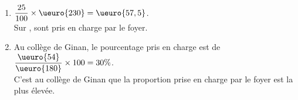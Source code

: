    \ \\ [-5mm]
   \begin{enumerate}
      \item $\dfrac{25}{100}\times\ueuro{230} =\ueuro{57,5}$. \\ [2mm]
         Sur , {\blue {} sont pris en charge par le foyer}.
      \item Au collège de Ginan, le pourcentage pris en charge est de $\dfrac{\ueuro{54}}{\ueuro{180}}\times100 =30\%$. \\ [2mm]
      C'est au {\blue collège de Ginan que la proportion prise en charge par le foyer est la plus élevée}.
   \end{enumerate}
